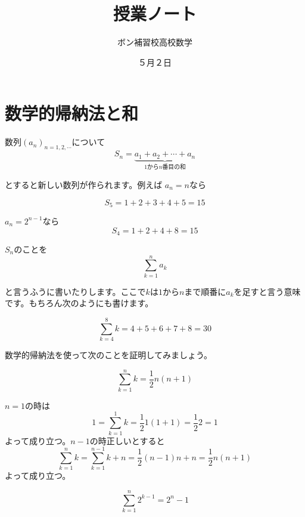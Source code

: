 \documentclass{ltjsarticle}
\title{授業ノート}
\author{ボン補習校高校数学}
\date{５月２日}
\begin{document}
\maketitle

\section{数学的帰納法と和}

数列$(a_n)_{n=1,2,\cdots}$について
\begin{equation*}
S_n = \underbrace{a_1+a_2+\cdots+a_n}_{\text{$1$から$n$番目の和}}
\end{equation*}

とすると新しい数列が作られます。例えば $a_n = n$なら

\begin{equation*}
S_5 = 1+2+3+4+5 = 15
\end{equation*}

$a_n = 2^{n-1}$なら
\begin{equation*}
S_4 = 1 + 2+ 4 + 8 = 15
\end{equation*}

$S_n$のことを
\begin{equation*}
\sum_{k=1}^n a_k
\end{equation*}

と言うふうに書いたりします。ここで$k$は$1$から$n$まで順番に$a_k$を足すと言う意味です。もちろん次のようにも書けます。

\begin{equation*}
\sum_{k=4}^8 k = 4+5+6+7+8 = 30
\end{equation*}

数学的帰納法を使って次のことを証明してみましょう。

\begin{equation*}
\sum_{k=1}^n k = {\frac 1 2}n(n+1)
\end{equation*}

$n=1$の時は
\begin{equation*}
1 = \sum_{k=1}^1 k = {\frac 1 2}1(1+1) = {\frac 1 2}2 = 1
\end{equation*}
よって成り立つ。$n-1$の時正しいとすると
\begin{equation*}
\sum_{k=1}^n k = \sum_{k=1}^{n-1} k+n = {\frac 1 2}(n-1)n +n = {\frac 1 2}n(n+1)
\end{equation*}
よって成り立つ。

\begin{equation*}
\sum_{k=1}^n 2^{k-1} =2^n-1
\end{equation*}
\end{document}
